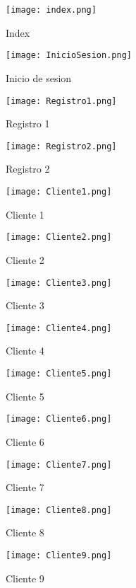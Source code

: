 \documentclass[12pt,a4paper, twosite]{article}
\begin{document}
\begin{figure}[h]
  \centering
  \texttt{[image: index.png]}
  \caption{Index}
\end{figure}
\begin{figure}[h]
  \centering
  \texttt{[image: InicioSesion.png]}
  \caption{Inicio de sesion}
\end{figure}
\begin{figure}[h]
  \centering
  \texttt{[image: Registro1.png]}
  \caption{Registro 1}
\end{figure}
\begin{figure}[h]
  \centering
  \texttt{[image: Registro2.png]}
  \caption{Registro 2}
\end{figure}
\begin{figure}[h]
  \centering
  \texttt{[image: Cliente1.png]}
  \caption{Cliente 1}
\end{figure}
\begin{figure}[h]
  \centering
  \texttt{[image: Cliente2.png]}
  \caption{Cliente 2}
\end{figure}
\begin{figure}[h]
  \centering
  \texttt{[image: Cliente3.png]}
  \caption{Cliente 3}
\end{figure}
\begin{figure}[h]
  \centering
  \texttt{[image: Cliente4.png]}
  \caption{Cliente 4}
\end{figure}
\begin{figure}[h]
  \centering
  \texttt{[image: Cliente5.png]}
  \caption{Cliente 5}
\end{figure}
\begin{figure}[h]
  \centering
  \texttt{[image: Cliente6.png]}
  \caption{Cliente 6}
\end{figure}
\begin{figure}[h]
  \centering
  \texttt{[image: Cliente7.png]}
  \caption{Cliente 7}
\end{figure}
\begin{figure}[h]
  \centering
  \texttt{[image: Cliente8.png]}
  \caption{Cliente 8}
\end{figure}
\begin{figure}[h]
  \centering
  \texttt{[image: Cliente9.png]}
  \caption{Cliente 9}
\end{figure}
\end{document}
